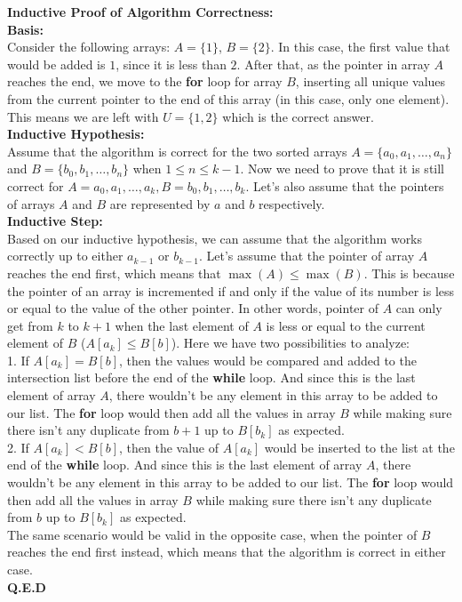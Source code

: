     \textbf{Inductive Proof of Algorithm Correctness:} \\
    \textbf{Basis:} \\
    Consider the following arrays: $A=\{1\}$, $B=\{2\}$. In this case, the first value that would be added is $1$, since it is less than $2$. After that, as the
    pointer in array $A$ reaches the end, we move to the \textbf{for} loop for array $B$, inserting all unique values from the current pointer to
    the end of this array (in this case, only one element). This means we are left with $U=\{1, 2\}$ which is the correct answer. \\
    \textbf{Inductive Hypothesis:} \\
    Assume that the algorithm is correct for the two sorted arrays $A=\{a_0, a_1, \ldots, a_n\}$ and $B=\{b_0, b_1, \ldots, b_n\}$ when $1 \leq n \leq k-1$.
    Now we need to prove that it is still correct for $A={a_0, a_1, \ldots, a_k}, B={b_0, b_1, \ldots, b_k}$. Let's also assume that the pointers
    of arrays $A$ and $B$ are represented by $a$ and $b$ respectively. \\ 
    \textbf{Inductive Step:} \\
    Based on our inductive hypothesis, we can assume that the algorithm works correctly up to either $a_{k-1}$ or $b_{k-1}$. Let's assume that the pointer of 
    array $A$ reaches the end first, which means that $\max(A) \leq \max(B)$. This is because the pointer of an array is incremented if and only if the value of its number
    is less or equal to the value of the other pointer. In other words, pointer of $A$ can only get from $k$ to $k+1$ when the last element of $A$ is less or equal to
    the current element of $B$ ($A[a_k] \leq B[b]$). Here we have two possibilities to analyze: \\
    1. If $A[a_k] = B[b]$, then the values would be compared and added to the intersection list before the end of the \textbf{while} loop. And since this is the last element of
    array $A$, there wouldn't be any element in this array to be added to our list. The \textbf{for} loop would then add all the values in array $B$ while making sure there isn't any duplicate
    from $b+1$ up to $B[b_k]$ as expected. \\
    2. If $A[a_k] < B[b]$, then the value of $A[a_k]$ would be inserted to the list at the end of the \textbf{while} loop. And since this is the last element of
    array $A$, there wouldn't be any element in this array to be added to our list. The \textbf{for} loop would then add all the values in array $B$ while making sure there isn't any duplicate
    from $b$ up to $B[b_k]$ as expected. \\
    The same scenario would be valid in the opposite case, when the pointer of $B$ reaches the end first instead, which means that the algorithm is correct in either case.\\
    \textbf{Q.E.D} \\

